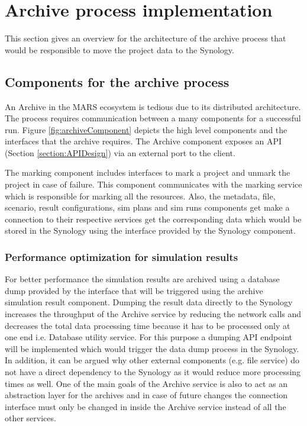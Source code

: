 \section{Archive process implementation}
This section gives an overview for the architecture of the archive process that would be responsible
to move the project data to the Synology. 

\subsection{Components for the archive process}
An Archive in the MARS ecosystem is tedious due to its distributed architecture. The process requires communication between a many components for a 
successful run. Figure \ref{fig:archiveComponent} depicts the high level components and the interfaces that the archive requires. The Archive
component exposes an API (Section \ref{section:APIDesign}) via an external port to the client. 

The marking component includes interfaces to mark a project and unmark the project in case of failure. This component communicates with the marking service which
is responsible for marking all the resources. Also, the metadata, file, scenario, result configurations, sim plans and sim runs components get make a connection to 
their respective services get the corresponding data which would be stored in the Synology using the interface provided by the Synology component.

\subsubsection{Performance optimization for simulation results}
\label{subsubsec:performanceSim}
For better performance
the simulation results are archived  using a database dump provided by the interface that will be triggered using the archive simulation result component. 
Dumping the result data directly to the Synology increases the throughput of the Archive service by reducing the network calls and decreases the total data processing
time because it has to be processed only at one end i.e. Database utility service. For this purpose a dumping API endpoint will be implemented which would trigger the data dump process in the 
Synology. In addition, it can be argued why other external components (e.g. file service) do not have a direct dependency to the Synology as it would reduce more
processing times as well. One of the main goals of the Archive service is also to act as an abstraction layer for the archives and in case of future changes the
connection interface must only be changed in inside the Archive service instead of all the other services.

